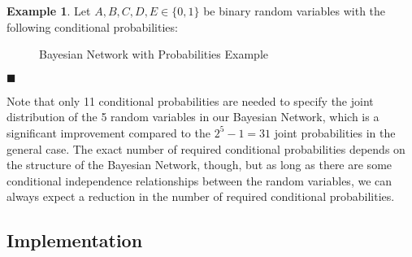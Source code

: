 \documentclass{article}
\theoremstyle{definition}
\newtheorem{example}{Example}
\newenvironment{exampleqed}
    {\begin{example}}
    {\hfill \qedsymbol \end{example}}
\renewcommand{\qedsymbol}{\(\blacksquare\)}
\renewcommand{\P}{\mathbb{P}}
\begin{document}
\begin{exampleqed}
    Let \(A, B, C, D, E \in \{0, 1\}\) be binary random variables with the following conditional probabilities:

    \begin{figure}[htbp]
        \centering
        \caption{Bayesian Network with Probabilities Example}
        \label{fig:bayesian_network_probs}
    \end{figure}
\end{exampleqed}

Note that only 11 conditional probabilities are needed to specify the joint distribution of the 5 random variables in our Bayesian Network, which is a significant improvement compared to the \(2^5 - 1 = 31\) joint probabilities in the general case. The exact number of required conditional probabilities depends on the structure of the Bayesian Network, though, but as long as there are some conditional independence relationships between the random variables, we can always expect a reduction in the number of required conditional probabilities.

\subsection{Implementation}
\end{document}
